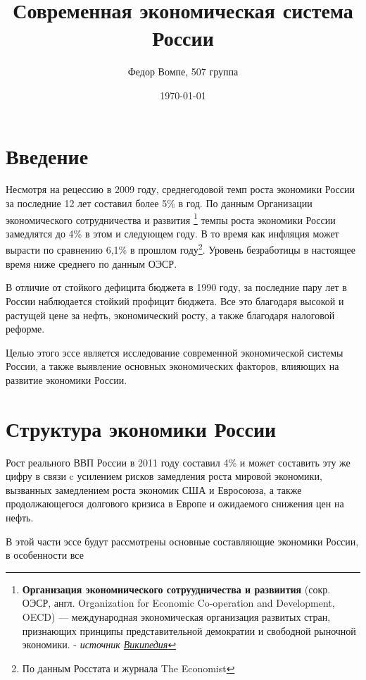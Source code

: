 \documentclass[a4paper,12pt]{article}
\title{Современная экономическая система России} %
\author{Федор Вомпе, 507 группа}
\date{\today} %
\begin{document}
\maketitle

\section{Введение}

Несмотря на рецессию в 2009 году, среднегодовой темп роста экономики России за
последние 12 лет составил более 5\% в год\cite{TheEconomist}. По данным
Организации экономического сотрудничества и развития 
\footnote{ \textbf{Организация экономиического сотруудничества
и развиития} (сокр. ОЭСР, англ. Organization for Economic Co-operation and
Development, OECD) — международная экономическая организация развитых стран,
признающих принципы представительной демократии и свободной рыночной экономики.
- \textit{источник
\href{http://ru.wikipedia.org/wiki/Организация экономиического сотруудничества
и развиития}{Википедия}} } темпы роста экономики России замедлятся 
до 4\% в этом и следующем году\cite{StandardPoor}. В то время как инфляция может
вырасти по сравнению 6,1\% в прошлом году\footnote{По данным Росстата и журнала The
Economist}. Уровень безработицы в настоящее время ниже среднего по данным ОЭСР.

В отличие от стойкого дефицита бюджета в 1990 году, за последние пару лет
в России наблюдается стойкий профицит бюджета. Все это благодаря
высокой и растущей цене за нефть, экономический росту, а также
благодаря налоговой реформе.

Целью этого эссе является исследование современной экономической
системы России, а также выявление основных экономических факторов, влияющих на
развитие экономики России.  

\section{Структура экономики России}

Рост реального ВВП России в 2011 году составил 4\% и может составить эту же
цифру в связи c усилением рисков замедления роста мировой экономики,
вызванных замедлением роста экономик США и Евросоюза, а также продолжающегося 
долгового кризиса в Европе и ожидаемого снижения цен на
нефть. \cite{WorldBank2011}

В этой части эссе будут рассмотрены основные составляющие экономики России, в
особенности все 

\end{document}
